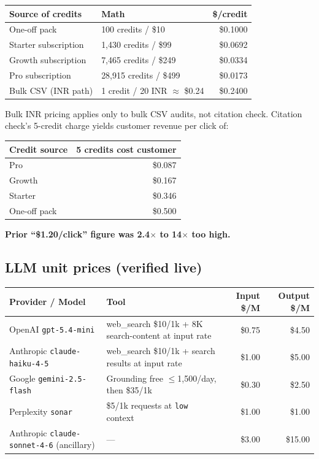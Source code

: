 \documentclass[11pt,letterpaper]{article}
\begin{document}
\begin{center}
\begin{tabular}{@{}llr@{}}
\toprule
\textbf{Source of credits} & \textbf{Math} & \textbf{\$/credit} \\
\midrule
One-off pack           & 100 credits / \$10     & \$0.1000 \\
Starter subscription   & 1,430 credits / \$99   & \$0.0692 \\
Growth subscription    & 7,465 credits / \$249  & \$0.0334 \\
Pro subscription       & 28,915 credits / \$499 & \$0.0173 \\
Bulk CSV (INR path)    & 1 credit / 20 INR $\approx$ \$0.24 & \$0.2400 \\
\bottomrule
\end{tabular}
\end{center}

Bulk INR pricing applies only to bulk CSV audits, not citation check.
Citation check's 5-credit charge yields customer revenue per click of:

\begin{center}
\begin{tabular}{@{}lr@{}}
\toprule
\textbf{Credit source} & \textbf{5 credits cost customer} \\
\midrule
Pro         & \$0.087 \\
Growth      & \$0.167 \\
Starter     & \$0.346 \\
One-off pack & \$0.500 \\
\bottomrule
\end{tabular}
\end{center}

\textbf{Prior ``\$1.20/click'' figure was 2.4$\times$ to 14$\times$ too high.}

\subsection{LLM unit prices (verified live)}

\begin{center}
\begin{tabular}{@{}llrr@{}}
\toprule
\textbf{Provider / Model} & \textbf{Tool} & \textbf{Input \$/M} & \textbf{Output \$/M} \\
\midrule
OpenAI \texttt{gpt-5.4-mini}         & web\_search \$10/1k + 8K search-content at input rate & \$0.75 & \$4.50 \\
Anthropic \texttt{claude-haiku-4-5}  & web\_search \$10/1k + search results at input rate    & \$1.00 & \$5.00 \\
Google \texttt{gemini-2.5-flash}     & Grounding free $\le$1,500/day, then \$35/1k            & \$0.30 & \$2.50 \\
Perplexity \texttt{sonar}            & \$5/1k requests at \texttt{low} context                & \$1.00 & \$1.00 \\
Anthropic \texttt{claude-sonnet-4-6} (ancillary) & ---                                        & \$3.00 & \$15.00 \\
\bottomrule
\end{tabular}
\end{center}
\end{document}
